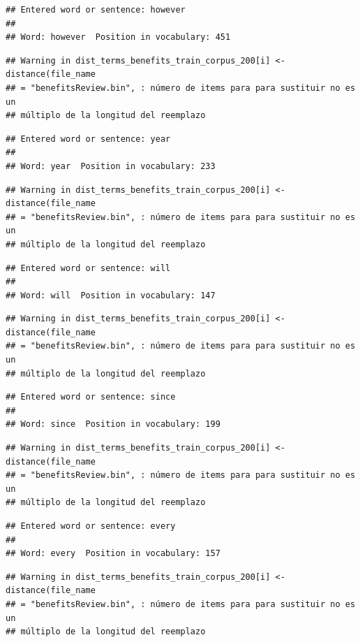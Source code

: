 \documentclass[spanish,]{article}
\begin{document}
\begin{verbatim}
## Entered word or sentence: however
## 
## Word: however  Position in vocabulary: 451
\end{verbatim}

\begin{verbatim}
## Warning in dist_terms_benefits_train_corpus_200[i] <- distance(file_name
## = "benefitsReview.bin", : número de items para para sustituir no es un
## múltiplo de la longitud del reemplazo
\end{verbatim}

\begin{verbatim}
## Entered word or sentence: year
## 
## Word: year  Position in vocabulary: 233
\end{verbatim}

\begin{verbatim}
## Warning in dist_terms_benefits_train_corpus_200[i] <- distance(file_name
## = "benefitsReview.bin", : número de items para para sustituir no es un
## múltiplo de la longitud del reemplazo
\end{verbatim}

\begin{verbatim}
## Entered word or sentence: will
## 
## Word: will  Position in vocabulary: 147
\end{verbatim}

\begin{verbatim}
## Warning in dist_terms_benefits_train_corpus_200[i] <- distance(file_name
## = "benefitsReview.bin", : número de items para para sustituir no es un
## múltiplo de la longitud del reemplazo
\end{verbatim}

\begin{verbatim}
## Entered word or sentence: since
## 
## Word: since  Position in vocabulary: 199
\end{verbatim}

\begin{verbatim}
## Warning in dist_terms_benefits_train_corpus_200[i] <- distance(file_name
## = "benefitsReview.bin", : número de items para para sustituir no es un
## múltiplo de la longitud del reemplazo
\end{verbatim}

\begin{verbatim}
## Entered word or sentence: every
## 
## Word: every  Position in vocabulary: 157
\end{verbatim}

\begin{verbatim}
## Warning in dist_terms_benefits_train_corpus_200[i] <- distance(file_name
## = "benefitsReview.bin", : número de items para para sustituir no es un
## múltiplo de la longitud del reemplazo
\end{verbatim}
\end{document}
